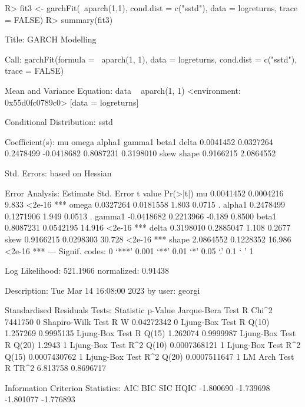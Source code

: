 \documentclass[article,nojss]{jss}
\begin{document}
\begin{Schunk}
\begin{Sinput}
R> fit3 <- garchFit(~aparch(1,1), cond.dist = c("sstd"), data = logreturns, trace = FALSE)
R> summary(fit3)
\end{Sinput}
\begin{Soutput}
Title:
 GARCH Modelling 

Call:
 garchFit(formula = ~aparch(1, 1), data = logreturns, cond.dist = c("sstd"), 
    trace = FALSE) 

Mean and Variance Equation:
 data ~ aparch(1, 1)
<environment: 0x55d0fc0789c0>
 [data = logreturns]

Conditional Distribution:
 sstd 

Coefficient(s):
        mu       omega      alpha1      gamma1       beta1       delta  
 0.0041452   0.0327264   0.2478499  -0.0418682   0.8087231   0.3198010  
      skew       shape  
 0.9166215   2.0864552  

Std. Errors:
 based on Hessian 

Error Analysis:
         Estimate  Std. Error  t value Pr(>|t|)    
mu      0.0041452   0.0004216    9.833   <2e-16 ***
omega   0.0327264   0.0181558    1.803   0.0715 .  
alpha1  0.2478499   0.1271906    1.949   0.0513 .  
gamma1 -0.0418682   0.2213966   -0.189   0.8500    
beta1   0.8087231   0.0542195   14.916   <2e-16 ***
delta   0.3198010   0.2885047    1.108   0.2677    
skew    0.9166215   0.0298303   30.728   <2e-16 ***
shape   2.0864552   0.1228352   16.986   <2e-16 ***
---
Signif. codes:  0 ‘***’ 0.001 ‘**’ 0.01 ‘*’ 0.05 ‘.’ 0.1 ‘ ’ 1

Log Likelihood:
 521.1966    normalized:  0.91438 

Description:
 Tue Mar 14 16:08:00 2023 by user: georgi 


Standardised Residuals Tests:
                                Statistic    p-Value  
 Jarque-Bera Test   R    Chi^2  7441750      0        
 Shapiro-Wilk Test  R    W      0.04272342   0        
 Ljung-Box Test     R    Q(10)  1.257269     0.9995135
 Ljung-Box Test     R    Q(15)  1.262074     0.9999987
 Ljung-Box Test     R    Q(20)  1.2943       1        
 Ljung-Box Test     R^2  Q(10)  0.0007368121 1        
 Ljung-Box Test     R^2  Q(15)  0.0007430762 1        
 Ljung-Box Test     R^2  Q(20)  0.0007511647 1        
 LM Arch Test       R    TR^2   6.813758     0.8696717

Information Criterion Statistics:
      AIC       BIC       SIC      HQIC 
-1.800690 -1.739698 -1.801077 -1.776893 
\end{Soutput}
\end{Schunk}
\end{document}
